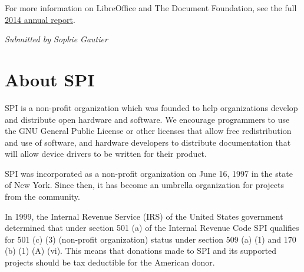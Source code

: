 \documentclass[letterpaper]{report}
\begin{document}
For more information on LibreOffice and The Document Foundation, see the
full
\href{https://wiki.documentfoundation.org/File:TDF2014AnnualReport.pdf}{2014
annual report}.

{\em Submitted by Sophie Gautier}


\appendix
\chapter{About SPI}

SPI is a non-profit organization which was founded to help organizations
develop and distribute open hardware and software. We encourage programmers
to use the GNU General Public License or other licenses that allow free
redistribution and use of software, and hardware developers to distribute
documentation that will allow device drivers to be written for their product.

SPI was incorporated as a non-profit organization on June 16, 1997 in the state
of New York. Since then, it has become an umbrella organization for projects
from the community.

In 1999, the Internal Revenue Service (IRS) of the United States government
determined that under section 501 (a) of the Internal Revenue Code SPI
qualifies for 501 (c) (3) (non-profit organization) status under section 509
(a) (1) and 170 (b) (1) (A) (vi). This means that donations made to SPI and its
supported projects should be tax deductible for the American donor.
\end{document}
